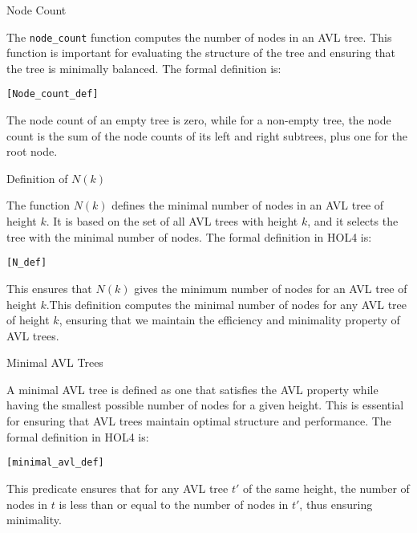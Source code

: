 \begin{defn}{Node Count}

The \texttt{node\_count} function computes the number of nodes in an AVL tree. This function is important for evaluating the structure of the tree and ensuring that the tree is minimally balanced. The formal definition is:

\begin{alltt}
	[Node_count_def]
\end{alltt}

The node count of an empty tree is zero, while for a non-empty tree, the node count is the sum of the node counts of its left and right subtrees, plus one for the root node.
\end{defn}



\begin{defn}{Definition of \(N(k)\)}

The function \(N(k)\) defines the minimal number of nodes in an AVL tree of height \(k\). It is based on the set of all AVL trees with height \(k\), and it selects the tree with the minimal number of nodes. The formal definition in HOL4 is:

\begin{alltt}
	[N_def]

\end{alltt}

This ensures that \(N(k)\) gives the minimum number of nodes for an AVL tree of height \(k\).This definition computes the minimal number of nodes for any AVL tree of height \( k \), ensuring that we maintain the efficiency and minimality property of AVL trees.
\end{defn}

\begin{defn}{Minimal AVL Trees}

A minimal AVL tree is defined as one that satisfies the AVL property while having the smallest possible number of nodes for a given height. This is essential for ensuring that AVL trees maintain optimal structure and performance. The formal definition in HOL4 is:

\begin{alltt}
	[minimal_avl_def]
\end{alltt}


This predicate ensures that for any AVL tree \( t' \) of the same height, the number of nodes in \( t \) is less than or equal to the number of nodes in \( t' \), thus ensuring minimality.
\end{defn}


